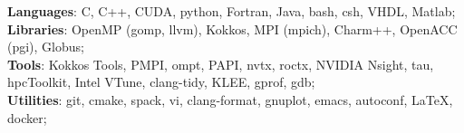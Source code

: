 \selectfont
{\textbf{Languages}: C, C++, CUDA, python, Fortran, Java,  bash, csh, VHDL, Matlab};\\
{\textbf{Libraries}:  OpenMP (gomp, llvm), Kokkos, MPI (mpich), Charm++, OpenACC (pgi), Globus}; \\
{\textbf{Tools}: Kokkos Tools, PMPI, ompt, PAPI, nvtx, roctx, NVIDIA Nsight, tau, hpcToolkit, Intel VTune, clang-tidy, KLEE,  gprof, gdb}; \\
{\textbf{Utilities}: git, cmake, spack, vi, clang-format, gnuplot, emacs, autoconf, LaTeX, docker};\\